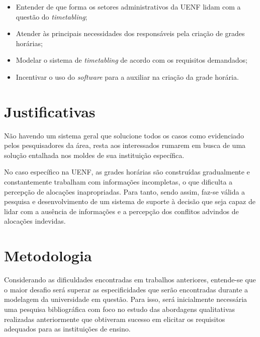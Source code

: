 \begin{itemize}
      \item Entender de que forma os setores administrativos da UENF lidam com a questão do \textit{timetabling};
      \item Atender às principais necessidades dos responsáveis pela criação de grades horárias;
      \item Modelar o sistema de \textit{timetabling} de acordo com os requisitos demandados;
      \item Incentivar o uso do \textit{software} para a auxiliar na criação da grade horária.
\end{itemize}

\section{Justificativas} \label{sec:Justificativas}      %

Não havendo um sistema geral que solucione todos os casos como evidenciado pelos pesquisadores da área, resta aos interessados rumarem em busca de uma solução entalhada nos moldes de sua instituição específica.

No caso específico na UENF, as grades horárias são construídas gradualmente e constantemente trabalham com informações incompletas, o que dificulta a percepção de alocações inapropriadas. Para tanto, sendo assim, faz-se válida a pesquisa e desenvolvimento de um sistema de suporte à decisão que seja capaz de lidar com a ausência de informações e a percepção dos conflitos advindos de alocações indevidas.

\section{Metodologia} \label{sec:Metodologia}            %

Considerando as dificuldades encontradas em trabalhos anteriores, entende-se que o maior desafio será superar as especificidades que serão encontradas durante a modelagem da universidade em questão. Para isso, será inicialmente necessária uma pesquisa bibliográfica com foco no estudo das abordagens qualitativas realizadas anteriormente que obtiveram sucesso em elicitar os requisitos adequados para as instituições de ensino.

